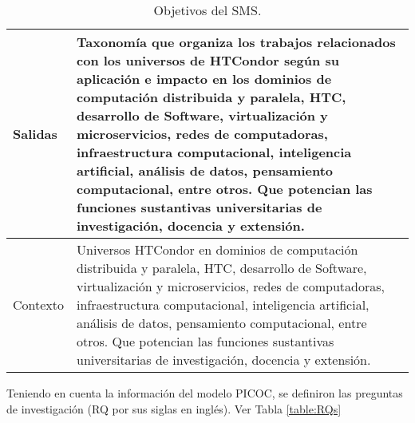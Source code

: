 \begin{table}[htbp]
\begin{tabular}{|>{\arraybackslash}m{1.7cm}|>{\arraybackslash}m{6.3cm}|}
		\hline
		Salidas & Taxonomía que organiza los trabajos relacionados con los universos de HTCondor según su aplicación e impacto en los dominios de computación distribuida y paralela, HTC, desarrollo de Software, virtualización y microservicios, redes de computadoras, infraestructura computacional, inteligencia artificial, análisis de datos, pensamiento computacional, entre otros. Que potencian las funciones sustantivas universitarias de investigación, docencia y extensión.\\
		
		\hline
		Contexto & Universos HTCondor en dominios de computación distribuida y paralela, HTC, desarrollo de Software, virtualización y microservicios, redes de computadoras, infraestructura computacional, inteligencia artificial, análisis de datos, pensamiento computacional, entre otros. Que potencian las funciones sustantivas universitarias de investigación, docencia y extensión.\\
		\hline
		
	\end{tabular}
	\vspace{6pt}  %
	\caption{Objetivos del SMS.}
	\label{table:PICOC}
	
\end{table}

Teniendo en cuenta la información del modelo PICOC, se definiron las preguntas de investigación (RQ por sus siglas en inglés). Ver Tabla \ref{table:RQs}

